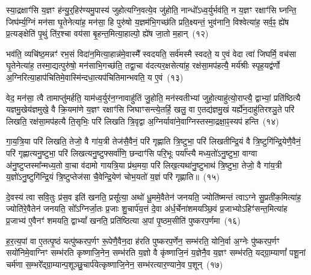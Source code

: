 स्या॒द्रक्षाꣳ॑सि य॒ज्ञꣳ ह॑न्यु॒र्॒\mbox{}हिर॑ण्यमु॒पास्य॑ जुहोत्यग्नि॒वत्ये॒व जु॑होति॒ नान्धो᳚\-ऽध्व॒र्युर्भव॑ति॒ न य॒ज्ञꣳ रक्षाꣳ॑सि घ्नन्ति॒ जिघ॑र्म्य॒ग्निं मन॑सा घृ॒तेनेत्या॑ह॒ मन॑सा॒ हि पुरु॑षो य॒ज्ञम॑भि॒गच्छ॑ति प्रति॒क्ष्यन्तं॒ भुव॑नानि॒ विश्वेत्या॑ह॒ सर्व॒ꣴ॒ ह्ये॑ष प्र॒त्यङ्क्षेति॑ पृ॒थुं ति॑र॒श्चा वय॑सा बृ॒हन्त॒मित्या॒हाल्पो॒ ह्ये॑ष जा॒तो म॒हान्~(१२)

भव॑ति॒ व्यचि॑ष्ठ॒मन्नꣳ॑ रभ॒सं विदा॑न॒मित्या॒हान्न॑मे॒वास्मै᳚ स्वदयति॒ सर्व॑मस्मै स्वदते॒ य ए॒वं वेदा त्वा॑ जिघर्मि॒ वच॑सा घृ॒तेनेत्या॑ह॒ तस्मा॒द्यत्पुरु॑षो॒ मन॑साभि॒गच्छ॑ति॒ तद्वा॒चा व॑दत्यर॒क्षसेत्या॑ह॒ रक्ष॑सा॒मप॑हत्यै॒ मर्य॑श्रीः स्पृह॒यद्व॑र्णो अ॒ग्निरित्या॒हाप॑चितिमे॒वास्मि॑न्दधा॒त्यप॑चितिमान्भवति॒ य ए॒वं~(१३)

वेद॒ मन॑सा॒ त्वै तामाप्तु॑मर्\mbox{}हति॒ याम॑ध्व॒र्युर॑न॒ग्नावाहु॑तिं जु॒होति॒ मन॑स्वतीभ्यां जुहो॒त्याहु॑त्यो॒राप्त्यै॒ द्वाभ्यां॒ प्रति॑ष्ठित्यै यज्ञमु॒खेय॑ज्ञमुखे॒ वै क्रि॒यमा॑णे य॒ज्ञꣳ रक्षाꣳ॑सि जिघाꣳसन्त्ये॒तर्\mbox{}हि॒ खलु॒ वा ए॒तद्य॑ज्ञमु॒खं यर्\mbox{}ह्ये॑न॒दाहु॑तिरश्ञु॒ते परि॑ लिखति॒ रक्ष॑सा॒मप॑हत्यै ति॒सृभिः॒ परि॑ लिखति त्रि॒वृद्वा अ॒ग्निर्यावा॑ने॒वाग्निस्तस्मा॒द्रक्षा॒ꣴ॒स्यप॑ हन्ति~(१४)

गा॒य॒त्रि॒या परि॑ लिखति॒ तेजो॒ वै गा॑य॒त्री तेज॑सै॒वैनं॒ परि॑ गृह्णाति त्रि॒ष्टुभा॒ परि॑ लिखतीन्द्रि॒यं वै त्रि॒ष्टुगि॑न्द्रि॒येणै॒वैनं॒ परि॑ गृह्णात्यनु॒ष्टुभा॒ परि॑ लिखत्यनु॒ष्टुफ्सर्वा॑णि॒ छन्दाꣳ॑सि परि॒भूः पर्या᳚प्त्यै मध्य॒तो॑\-ऽनु॒ष्टुभा॒ वाग्वा अ॑नु॒ष्टुप्तस्मा᳚न्मध्य॒तो वा॒चा व॑दामो गायत्रि॒या प्र॑थ॒मया॒ परि॑ लिख॒त्यथा॑नु॒ष्टुभाथ॑ त्रि॒ष्टुभा॒ तेजो॒ वै गा॑य॒त्री य॒ज्ञो॑\-ऽनु॒ष्टुगि॑न्द्रि॒यं त्रि॒ष्टुप्तेज॑सा चै॒वेन्द्रि॒येण॑ चोभ॒यतो॑ य॒ज्ञं परि॑ गृह्णाति॥~(१५)

{\anuvakamend[{अ॒न्धो᳚\-ऽध्व॒र्युर्म॒हान्भ॑वति त्रि॒ष्टुभा॒ तेजो॒ वै गा॑य॒त्री त्रयो॑दश च}]}%

दे॒वस्य॑ त्वा सवि॒तुः प्र॑स॒व इति॑ खनति॒ प्रसू᳚त्या॒ अथो॑ धू॒ममे॒वैतेन॑ जनयति॒ ज्योति॑ष्मन्तं त्वाऽग्ने सु॒प्रती॑क॒मित्या॑ह॒ ज्योति॑रे॒वैतेन॑ जनयति॒ सो᳚\-ऽग्निर्जा॒तः प्र॒जाः शु॒चार्प॑य॒त्तं दे॒वा अ॑र्ध॒र्चेना॑शमयञ्छि॒वं प्र॒जाभ्यो\-ऽहिꣳ॑सन्त॒मित्या॑ह प्र॒जाभ्य॑ ए॒वैनꣳ॑ शमयति॒ द्वा\-भ्यां᳚ खनति॒ प्रति॑ष्ठित्या अ॒पां पृ॒ष्ठम॒सीति॑ पुष्करप॒र्णमा~(१६)

ह॒र॒त्य॒पां वा ए॒तत्पृ॒ष्ठं यत्पु॑ष्करप॒र्णꣳ रू॒पेणै॒वैन॒दा ह॑रति पुष्करप॒र्णेन॒ सम्भ॑रति॒ योनि॒र्वा अ॒ग्नेः पु॑ष्करप॒र्णꣳ सयो॑निमे॒वाग्निꣳ सम्भ॑रति कृष्णाजि॒नेन॒ सम्भ॑रति य॒ज्ञो वै कृ॑ष्णाजि॒नं य॒ज्ञेनै॒व य॒ज्ञꣳ सम्भ॑रति॒ यद्ग्रा॒म्याणां᳚ पशू॒नां चर्म॑णा स॒म्भरे᳚द्ग्रा॒म्यान्प॒शूञ्छु॒चार्प॑येत्कृष्णाजि॒नेन॒ सम्भ॑रत्यार॒ण्याने॒व प॒शून्~(१७)

